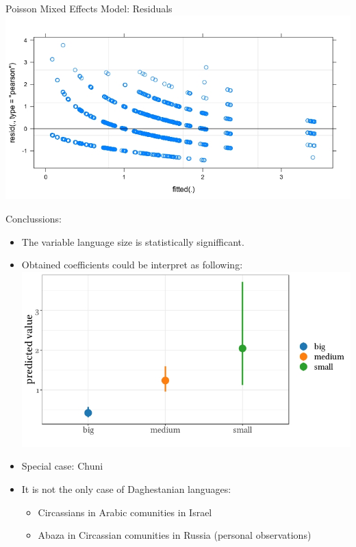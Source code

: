 \documentclass[13pt, t]{beamer}
\begin{document}
\begin{frame}{Poisson Mixed Effects Model: Residuals}
\includegraphics[width=\linewidth]{images/14_poisson_residuals_750_400}
\end{frame}

\begin{frame}{Conclussions:}
\begin{itemize}
\item The variable language size is statistically signifficant.
\item Obtained coefficients could be interpret as following:\\
\includegraphics[width=\linewidth]{images/15_predicted_750_400} \pause
\item Special case: Chuni \pause
\item It is not the only case of Daghestanian languages:
\begin{itemize}
\item Circassians in Arabic comunities in Israel \citep{kreindler95}
\item Abaza in Circassian comunities in Russia (personal observations)
\end{itemize}
\end{itemize}
\end{frame}
\end{document}
